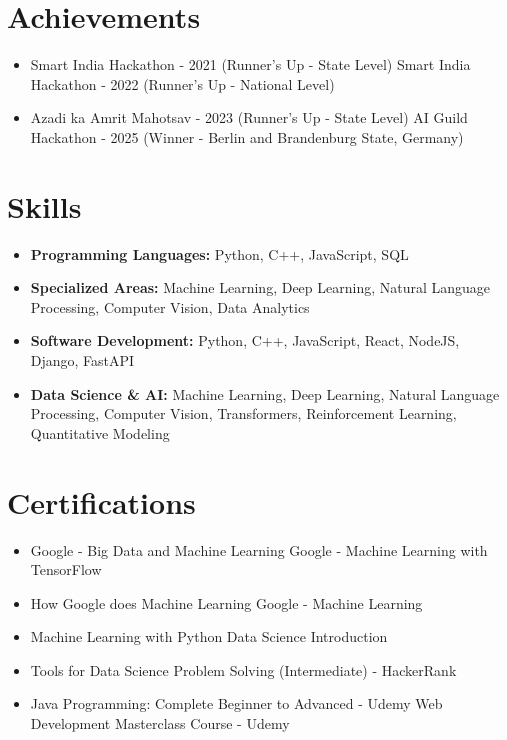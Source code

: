 \documentclass[a4paper,10pt]{article}
\begin{document}
\section*{Achievements}
\begin{itemize}
\item Smart India Hackathon - 2021 (Runner's Up - State Level) \hfill Smart India Hackathon - 2022 (Runner's Up - National Level)
\item Azadi ka Amrit Mahotsav - 2023 (Runner's Up - State Level) \hfill AI Guild Hackathon - 2025 (Winner - Berlin and Brandenburg State, Germany)
\end{itemize}

\section*{Skills}
\begin{itemize}
  \item \textbf{Programming Languages:} Python, C++, JavaScript, SQL
  \item \textbf{Specialized Areas:} Machine Learning, Deep Learning, Natural Language Processing, Computer Vision, Data Analytics
  \item \textbf{Software Development:} Python, C++, JavaScript, React, NodeJS, Django, FastAPI
  \item \textbf{Data Science \& AI:} Machine Learning, Deep Learning, Natural Language Processing, Computer Vision, Transformers, Reinforcement Learning, Quantitative Modeling
\end{itemize}

\section*{Certifications}
\begin{itemize}
\item Google - Big Data and Machine Learning \hfill Google - Machine Learning with TensorFlow
\item How Google does Machine Learning \hfill Google - Machine Learning
\item Machine Learning with Python \hfill Data Science Introduction
\item Tools for Data Science \hfill Problem Solving (Intermediate) - HackerRank
\item Java Programming: Complete Beginner to Advanced - Udemy \hfill Web Development Masterclass Course - Udemy
\end{itemize}
\end{document}
